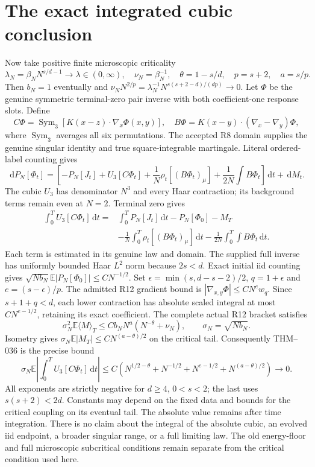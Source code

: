 \documentclass[10pt]{article}
\newcommand{\E}{\mathbb E}
\newcommand{\dd}{\,\mathrm d}
\begin{document}
\newpage
\section*{The exact integrated cubic conclusion}
Now take positive finite microscopic criticality
\[
 \lambda_N=\beta_NN^{s/d-1}\to\lambda\in(0,\infty),\quad
 \nu_N=\beta_N^{-1},\quad\theta=1-s/d,\quad p=s+2,\quad a=s/p.
\]
Then $b_N=1$ eventually and
$\nu_NN^{2/p}=\lambda_N^{-1}N^{s(s+2-d)/(dp)}\to0$.
Let $\Phi$ be the genuine symmetric terminal-zero pair inverse with both
coefficient-one response slots. Define
\[
 C\Phi=\operatorname{Sym}_3[K(x-z)\cdot\nabla_x\Phi(x,y)],\quad
 B\Phi=K(x-y)\cdot(\nabla_x-\nabla_y)\Phi,
\]
where $\operatorname{Sym}_3$ averages all six permutations. The accepted R8
domain supplies the genuine singular identity and true square-integrable
martingale. Literal ordered-label counting gives
\[
 \dd P_N[\Phi_t]=\left[-P_N[J_t]+U_3[C\Phi_t]
 +\frac1N\rho_t[(B\Phi_t)_\mu]+\frac1{2N}\int B\Phi_t\right]\dd t+\dd M_t.
\]
The cubic $U_3$ has denominator $N^3$ and every Haar contraction; its
background terms remain even at $N=2$. Terminal zero gives
\begin{align*}
 \int_0^T U_3[C\Phi_t]\dd t
 ={}&\int_0^T P_N[J_t]\dd t-P_N[\Phi_0]-M_T\\
 &-\frac1N\int_0^T\rho_t[(B\Phi_t)_\mu]\dd t
 -\frac1{2N}\int_0^T\int B\Phi_t\dd t.
\end{align*}
Each term is estimated in its genuine law and domain. The supplied full
inverse has uniformly bounded Haar $L^2$ norm because $2s<d$. Exact initial
iid counting gives $\sqrt{Nb_N}\E|P_N[\Phi_0]|\le CN^{-1/2}$.
Set $\epsilon=\min(s,d-s-2)/2$, $q=1+\epsilon$ and $e=(s-\epsilon)/p$.
The admitted R12 gradient bound is
$|\nabla_{x,y}\Phi|\le CN^e w_q$. Since $s+1+q<d$, each lower contraction
has absolute scaled integral at most $CN^{e-1/2}$, retaining its exact coefficient.
The complete actual R12 bracket satisfies
\[
 \sigma_N^2\E\langle M\rangle_T
 \le Cb_NN^a(N^{-\theta}+\nu_N),\qquad \sigma_N=\sqrt{Nb_N}.
\]
Isometry gives $\sigma_N\E|M_T|\le CN^{(a-\theta)/2}$ on the critical tail.
Consequently THM--036 is the precise bound
\[
 \boxed{\ \sigma_N\E\left|\int_0^T U_3[C\Phi_t]\dd t\right|
 \le C\left(N^{1/2-\theta}+N^{-1/2}+N^{e-1/2}+N^{(a-\theta)/2}\right)\to0.\ }
\]
All exponents are strictly negative for $d\ge4$, $0<s<2$; the last uses
$s(s+2)<2d$. Constants may depend on the fixed data and bounds for the
critical coupling on its eventual tail. The absolute value remains after
time integration. There is no claim about the integral of the absolute cubic,
an evolved iid endpoint, a broader singular range, or a full limiting law.
The old energy-floor and full microscopic subcritical conditions remain
separate from the critical condition used here.
\end{document}
